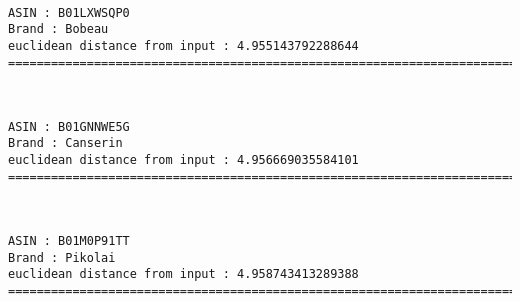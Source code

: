 \documentclass[11pt]{article}
\begin{document}
    
    
    \begin{center}
    \end{center}
    { \hspace*{\fill} \\}
    
    \begin{Verbatim}[commandchars=\\\{\}]
ASIN : B01LXWSQP0
Brand : Bobeau
euclidean distance from input : 4.955143792288644
=============================================================================================================================

    \end{Verbatim}

    
    
    \begin{center}
    \end{center}
    { \hspace*{\fill} \\}
    
    \begin{Verbatim}[commandchars=\\\{\}]
ASIN : B01GNNWE5G
Brand : Canserin
euclidean distance from input : 4.956669035584101
=============================================================================================================================

    \end{Verbatim}

    
    
    \begin{center}
    \end{center}
    { \hspace*{\fill} \\}
    
    \begin{Verbatim}[commandchars=\\\{\}]
ASIN : B01M0P91TT
Brand : Pikolai
euclidean distance from input : 4.958743413289388
=============================================================================================================================

    \end{Verbatim}
\end{document}
